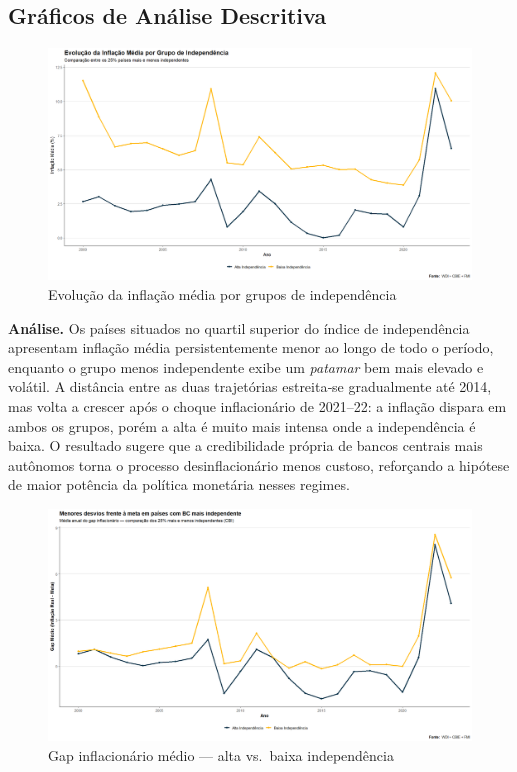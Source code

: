 \documentclass[a4paper,12pt]{article}[abnt2]
\begin{document}
\subsection{\textbf{Gráficos de Análise Descritiva}}

\begin{figure}[H]
    \centering
    \caption{Evolução da inflação média por grupos de independência}
    \label{fig:infl_media}
    \includegraphics[width=.85\linewidth]{Imagens/an1i3.png}
\end{figure}

\begin{flushleft}\small
\textbf{Análise.}
Os países situados no quartil superior do índice de independência apresentam inflação média persistentemente menor ao longo de todo o período, enquanto o grupo menos independente exibe um \textit{patamar} bem mais elevado e volátil.  
A distância entre as duas trajetórias estreita‑se gradualmente até 2014, mas volta a crescer após o choque inflacionário de 2021–22: a inflação dispara em ambos os grupos, porém a alta é muito mais intensa onde a independência é baixa.  
O resultado sugere que a credibilidade própria de bancos centrais mais autônomos torna o processo desinflacionário menos custoso, reforçando a hipótese de maior potência da política monetária nesses regimes.
\end{flushleft}

\begin{figure}[H]
    \centering
    \caption{Gap inflacionário médio — alta vs.\ baixa independência}
    \label{fig:gap_media}
    \includegraphics[width=.85\linewidth]{Imagens/an1i8.png}
\end{figure}
\end{document}
